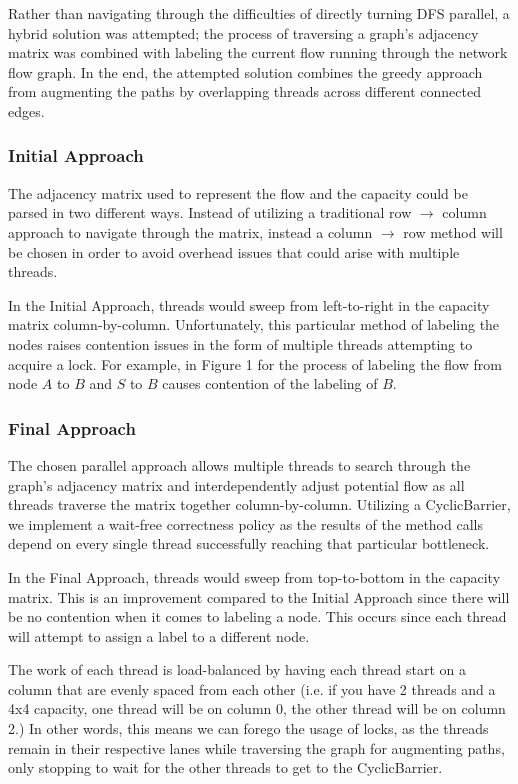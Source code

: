         Rather than navigating through the difficulties of directly turning DFS parallel, a hybrid solution was attempted; the process of traversing a graph's adjacency matrix was combined with labeling the current flow running through the network flow graph. In the end, the attempted solution combines the greedy approach from augmenting the paths by overlapping threads across different connected edges.
        
        
    \subsubsection{Initial Approach}
    
        The adjacency matrix used to represent the flow and the capacity could be parsed in two different ways. Instead of utilizing a traditional row $\xrightarrow{}$ column approach to navigate through the matrix, instead a column $\xrightarrow{}$ row method will be chosen in order to avoid overhead issues that could arise with multiple threads.
    
        
        In the Initial Approach, threads would sweep from left-to-right in the capacity matrix column-by-column. Unfortunately, this particular method of labeling the nodes raises contention issues in the form of multiple threads attempting to acquire a lock. For example, in Figure 1 for the process of labeling the flow from node $A$ to $B$ and $S$ to $B$ causes contention of the labeling of $B$.
        
        
    \subsubsection{Final Approach}
        The chosen parallel approach allows multiple threads to search through the graph's adjacency matrix and interdependently adjust potential flow as all threads traverse the matrix together column-by-column. Utilizing a CyclicBarrier, we implement a wait-free correctness policy as the results of the method calls depend on every single thread successfully reaching that particular bottleneck.
        
        In the Final Approach, threads would sweep from top-to-bottom in the capacity matrix. This is an improvement compared to the Initial Approach 
        since there will be no contention when it comes to labeling a node. This occurs since each thread will attempt to assign a label to a different node.
        
        The work of each thread is load-balanced by having each thread start on a column that are evenly spaced from each other (i.e. if you have 2 threads and a 4x4 capacity, one thread will be on column 0, the other thread will be on column 2.) In other words, this means we can forego the usage of locks, as the threads remain in their respective lanes while traversing the graph for augmenting paths, only stopping to wait for the other threads to get to the CyclicBarrier.
        
